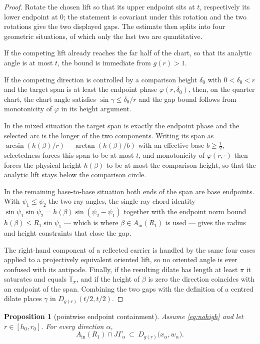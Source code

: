 \documentclass[11pt]{article}
\theoremstyle{plain}
\newtheorem{proposition}[theorem]{Proposition}
\theoremstyle{definition}
\theoremstyle{remark}
\newcommand{\Tp}{\mathbb{T}_{\pi}}
\newcommand{\Ain}{A_{\mathrm{in}}}
\begin{document}
\begin{proof}
Rotate the chosen lift so that its upper endpoint sits at $t$, respectively its
lower endpoint at $0$; the statement is covariant under this rotation and the
two rotations give the two displayed gaps. The estimate then splits into four
geometric situations, of which only the last two are quantitative.

If the competing lift already reaches the far half of the chart, so that its
analytic angle is at most $t$, the bound is immediate from $g(r)>1$.

If the competing direction is controlled by a comparison height $\delta_{0}$
with $0<\delta_{0}<r$ and the target span is at least the endpoint phase
$\varphi(r,\delta_{0})$, then, on the quarter chart, the chart angle satisfies
$\sin\gamma\le\delta_{0}/r$ and the gap bound follows from monotonicity of
$\varphi$ in its height argument.

In the mixed situation the target span is exactly the endpoint phase and the
selected arc is the longer of the two components. Writing its span as
$\arcsin(h(\beta)/r)-\arctan(h(\beta)/b)$ with an effective base $b\ge\tfrac12$,
selectedness forces this span to be at most $t$, and monotonicity of
$\varphi(r,\cdot)$ then forces the physical height $h(\beta)$ to be at most the
comparison height, so that the analytic lift stays below the comparison circle.

In the remaining base-to-base situation both ends of the span are base
endpoints. With $\psi_{1}\le\psi_{2}$ the two ray angles, the single-ray chord
identity $\sin\psi_{1}\sin\psi_{2}=h(\beta)\sin(\psi_{2}-\psi_{1})$ together
with the endpoint norm bound $h(\beta)\le R_{1}\sin\psi_{1}$ --- which is where
$\beta\in\Ain(R_{1})$ is used --- gives the radius and height constraints that
close the gap.

The right-hand component of a reflected carrier is handled by the same four
cases applied to a projectively equivalent oriented lift, so no oriented angle
is ever confused with its antipode. Finally, if the resulting dilate has length
at least $\pi$ it saturates and equals $\Tp$, and if the height of $\beta$ is
zero the direction coincides with an endpoint of the span. Combining the two
gaps with the definition of a centred dilate places $\gamma$ in
$D_{g(r)}(t/2,t/2)$.
\end{proof}

\begin{proposition}[pointwise endpoint containment]\label{prop:endpoint}
Assume \eqref{eq:nohigh} and let $r\in[h_{0},r_{0}]$. For every direction $\alpha$,
\begin{equation}\label{eq:containment}
  \Ain(R_{1})\cap J\Gamma_{\alpha}
  \ \subset\ D_{g(r)}\bigl(x_{\alpha},w_{\alpha}\bigr).
\end{equation}
\end{proposition}
\end{document}

